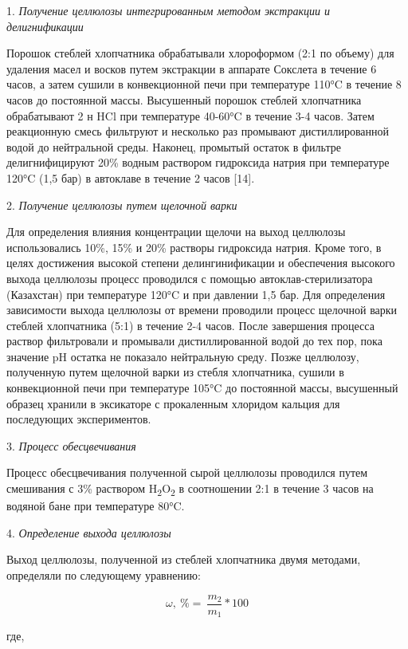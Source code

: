 \begin{multicols}{2}
1. \emph{Получение целлюлозы интегрированным методом экстракции и делигнификации}

Порошок стеблей хлопчатника обрабатывали хлороформом (2:1 по объему) для
удаления масел и восков путем экстракции в аппарате Сокслета в течение 6
часов, а затем сушили в конвекционной печи при температуре 110°C в
течение 8 часов до постоянной массы. Высушенный порошок стеблей
хлопчатника обрабатывают 2 н HCl при температуре 40-60°C в течение 3-4
часов. Затем реакционную смесь фильтруют и несколько раз промывают
дистиллированной водой до нейтральной среды. Наконец, промытый остаток в
фильтре делигнифицируют 20\% водным раствором гидроксида натрия при
температуре 120°C (1,5 бар) в автоклаве в течение 2 часов {[}14{]}.

2. \emph{Получение целлюлозы путем щелочной варки}

Для определения влияния концентрации щелочи на выход целлюлозы
использовались 10\%, 15\% и 20\% растворы гидроксида натрия. Кроме того,
в целях достижения высокой степени делингинификации и обеспечения
высокого выхода целлюлозы процесс проводился с помощью
автоклав-стерилизатора (Казахстан) при температуре 120°C и при давлении
1,5 бар. Для определения зависимости выхода целлюлозы от времени
проводили процесс щелочной варки стеблей хлопчатника (5:1) в течение 2-4
часов. После завершения процесса раствор фильтровали и промывали
дистиллированной водой до тех пор, пока значение pH остатка не показало
нейтральную среду. Позже целлюлозу, полученную путем щелочной варки из
стебля хлопчатника, сушили в конвекционной печи при температуре 105°C до
постоянной массы, высушенный образец хранили в эксикаторе с прокаленным
хлоридом кальция для последующих экспериментов.

3. \emph{Процесс обесцвечивания}

Процесс обесцвечивания полученной сырой целлюлозы проводился путем
смешивания с 3\% раствором H\textsubscript{2}O\textsubscript{2} в
соотношении 2:1 в течение 3 часов на водяной бане при температуре 80°C.

4. \emph{Определение выхода целлюлозы}

Выход целлюлозы, полученной из стеблей хлопчатника двумя методами,
определяли по следующему уравнению:

\begin{equation}
\omega,\ \% = \ \frac{m_{2}}{m_{1}}*100
\end{equation}

где,


\end{multicols}
